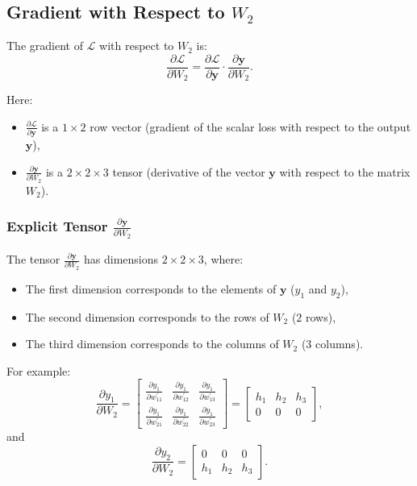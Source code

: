 \begin{notechapter}
\subsection{Gradient with Respect to \( W_2 \)}

The gradient of \( \mathcal{L} \) with respect to \( W_2 \) is:
\[
\frac{\partial \mathcal{L}}{\partial W_2} = \frac{\partial \mathcal{L}}{\partial \mathbf{y}} 
\cdot \frac{\partial \mathbf{y}}{\partial W_2}.
\]

Here:
\begin{itemize}
    \item \( \frac{\partial \mathcal{L}}{\partial \mathbf{y}} \) is a \( 1 \times 2 \) 
          row vector (gradient of the scalar loss with respect to the output \( \mathbf{y} \)),
    \item \( \frac{\partial \mathbf{y}}{\partial W_2} \) is a \( 2 \times 2 \times 3 \) 
          tensor (derivative of the vector \( \mathbf{y} \) with respect to the matrix \( W_2 \)).
\end{itemize}

\subsubsection{Explicit Tensor \( \frac{\partial \mathbf{y}}{\partial W_2} \)}

The tensor \( \frac{\partial \mathbf{y}}{\partial W_2} \) has dimensions \( 2 \times 2 \times 3 \), 
where:
\begin{itemize}
    \item The first dimension corresponds to the elements of \( \mathbf{y} \) (\( y_1 \) and \( y_2 \)),
    \item The second dimension corresponds to the rows of \( W_2 \) (\( 2 \) rows),
    \item The third dimension corresponds to the columns of \( W_2 \) (\( 3 \) columns).
\end{itemize}

For example:
\[
\frac{\partial y_1}{\partial W_2} = \begin{bmatrix}
\frac{\partial y_1}{\partial w_{11}^{\prime}} & \frac{\partial y_1}{\partial w_{12}^{\prime}} & \frac{\partial y_1}{\partial w_{13}^{\prime}} \\
\frac{\partial y_1}{\partial w_{21}^{\prime}} & \frac{\partial y_1}{\partial w_{22}^{\prime}} & \frac{\partial y_1}{\partial w_{23}^{\prime}}
\end{bmatrix} = \begin{bmatrix}
h_1 & h_2 & h_3 \\
0 & 0 & 0
\end{bmatrix},
\]
and
\[
\frac{\partial y_2}{\partial W_2} = \begin{bmatrix}
0 & 0 & 0 \\
h_1 & h_2 & h_3
\end{bmatrix}.
\]


\end{notechapter}
